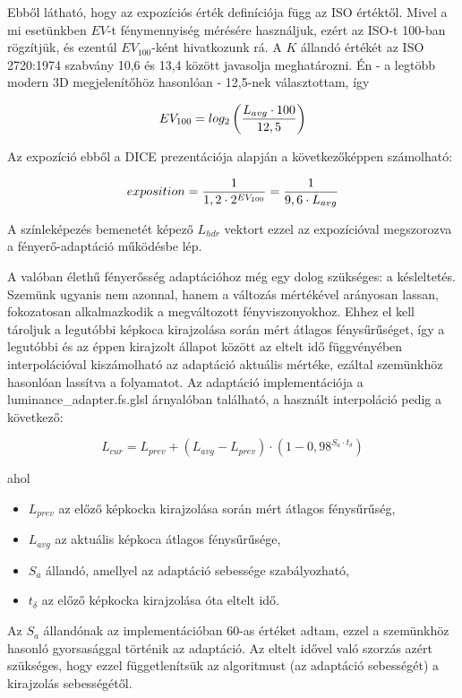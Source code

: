 Ebből látható, hogy az expozíciós érték definíciója függ az ISO értéktől. Mivel a mi esetünkben \(EV\)-t fénymennyiség mérésére használjuk, ezért az ISO-t 100-ban rögzítjük, és ezentúl \(EV_{100}\)-ként hivatkozunk rá. A \(K\) állandó értékét az ISO 2720:1974 szabvány 10,6 és 13,4 között javasolja meghatározni. Én - a legtöbb modern 3D megjelenítőhöz hasonlóan - 12,5-nek választottam, így

\[
EV_{100} = log_2\left({ L_{avg} \cdot 100 } \over 12,5\right)
\]

Az expozíció ebből a DICE prezentációja alapján a következőképpen számolható:

\[
exposition = { 1 \over { 1,2 \cdot 2^{EV_{100}} } } = { 1 \over { 9,6 \cdot L_{avg} } }
\]

A színleképezés bemenetét képező \(L_{hdr}\) vektort ezzel az expozícióval megszorozva a fényerő-adaptáció működésbe lép.

A valóban élethű fényerősség adaptációhoz még egy dolog szükséges: a késleltetés. Szemünk ugyanis nem azonnal, hanem a változás mértékével arányosan lassan, fokozatosan alkalmazkodik a megváltozott fényviszonyokhoz. Ehhez el kell tároljuk a legutóbbi képkoca kirajzolása során mért átlagos fénysűrűséget, így a legutóbbi és az éppen kirajzolt állapot között az eltelt idő függvényében interpolációval kiszámolható az adaptáció aktuális mértéke, ezáltal szemünkhöz hasonlóan lassítva a folyamatot. Az adaptáció implementációja a luminance\_adapter.fs.glsl árnyalóban található, a használt interpoláció pedig a következő:

\[
L_{cur} = L_{prev} + (L_{avg} - L_{prev}) \cdot (1 - 0,98^{S_a \cdot t_{\delta}})
\]

ahol

\begin{itemize}[noitemsep]
\item \(L_{prev}\) az előző képkocka kirajzolása során mért átlagos fénysűrűség,
\item \(L_{avg}\) az aktuális képkoca átlagos fénysűrűsége,
\item \(S_a\) állandó, amellyel az adaptáció sebessége szabályozható,
\item \(t_{\delta}\) az előző képkocka kirajzolása óta eltelt idő.
\end{itemize}

Az \(S_a\) állandónak az implementációban 60-as értéket adtam, ezzel a szemünkhöz hasonló gyorsasággal történik az adaptáció. Az eltelt idővel való szorzás azért szükséges, hogy ezzel függetlenítsük az algoritmust (az adaptáció sebességét) a kirajzolás sebességétől.

